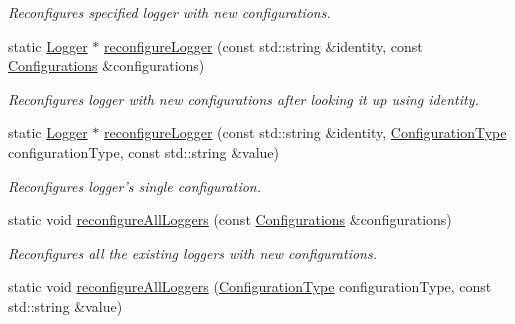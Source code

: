 \begin{DoxyCompactItemize}
\begin{DoxyCompactList}\small\item\em Reconfigures specified logger with new configurations. \end{DoxyCompactList}\item 
\hypertarget{classel_1_1Loggers_a105f776fe19cb7fa2fccd2993d9f7a7c}{static \hyperlink{classel_1_1Logger}{Logger} $\ast$ \hyperlink{classel_1_1Loggers_a105f776fe19cb7fa2fccd2993d9f7a7c}{reconfigure\-Logger} (const std\-::string \&identity, const \hyperlink{classel_1_1Configurations}{Configurations} \&configurations)}\label{classel_1_1Loggers_a105f776fe19cb7fa2fccd2993d9f7a7c}

\begin{DoxyCompactList}\small\item\em Reconfigures logger with new configurations after looking it up using identity. \end{DoxyCompactList}\item 
\hypertarget{classel_1_1Loggers_aef49fdae329cefcc1c01428568dced4b}{static \hyperlink{classel_1_1Logger}{Logger} $\ast$ \hyperlink{classel_1_1Loggers_aef49fdae329cefcc1c01428568dced4b}{reconfigure\-Logger} (const std\-::string \&identity, \hyperlink{namespaceel_a281f5db6d6163678bc68a8b23b59e124}{Configuration\-Type} configuration\-Type, const std\-::string \&value)}\label{classel_1_1Loggers_aef49fdae329cefcc1c01428568dced4b}

\begin{DoxyCompactList}\small\item\em Reconfigures logger's single configuration. \end{DoxyCompactList}\item 
\hypertarget{classel_1_1Loggers_ac834df0f5e9e3dab18e70321a2543af7}{static void \hyperlink{classel_1_1Loggers_ac834df0f5e9e3dab18e70321a2543af7}{reconfigure\-All\-Loggers} (const \hyperlink{classel_1_1Configurations}{Configurations} \&configurations)}\label{classel_1_1Loggers_ac834df0f5e9e3dab18e70321a2543af7}

\begin{DoxyCompactList}\small\item\em Reconfigures all the existing loggers with new configurations. \end{DoxyCompactList}\item 
\hypertarget{classel_1_1Loggers_a1ebd33bc0208b430f41508e34509c7c9}{static void \hyperlink{classel_1_1Loggers_a1ebd33bc0208b430f41508e34509c7c9}{reconfigure\-All\-Loggers} (\hyperlink{namespaceel_a281f5db6d6163678bc68a8b23b59e124}{Configuration\-Type} configuration\-Type, const std\-::string \&value)}\label{classel_1_1Loggers_a1ebd33bc0208b430f41508e34509c7c9}


\end{DoxyCompactItemize}
